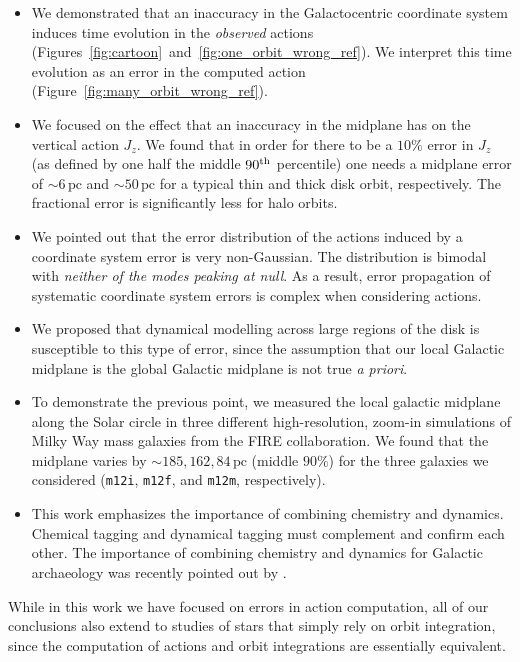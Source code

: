 \documentclass[twocolumn]{aastex62}
\newcommand{\pc}{\text{pc}}
\newcommand{\mi}{\texttt{m12i}}
\newcommand{\mf}{\texttt{m12f}}
\newcommand{\mm}{\texttt{m12m}}
\newcommand{\uth}{\textsuperscript{th}}
\begin{document}
\begin{itemize}
\item We demonstrated that an inaccuracy in the Galactocentric coordinate
system induces time evolution in the {\em observed} actions
(Figures~\ref{fig:cartoon}~and~\ref{fig:one_orbit_wrong_ref}). We interpret
this time evolution as an error in the computed action
(Figure~\ref{fig:many_orbit_wrong_ref}).

\item  We focused on the effect that an
inaccuracy in the midplane has on the vertical action $J_z$. We found that in
order for there to be a $10\%$ error in $J_z$ (as defined by one half the middle
$90\uth$ percentile) one needs a midplane error of $\sim6\,\pc$ and
$\sim50\,\pc$ for a typical thin and thick disk orbit, respectively. The
fractional error is significantly less for halo orbits.

\item We pointed out that the error distribution of the actions induced by a
coordinate system error is very non-Gaussian. The distribution is bimodal with
{\em neither of the modes peaking at 
     null}. 
As a result, error
propagation of systematic coordinate system errors is 
     complex
when considering actions.

\item We proposed that dynamical modelling across large regions of the disk is
susceptible to this type of error, since the assumption that our local
Galactic midplane is the global Galactic midplane is not true {\em a priori}.

\item To demonstrate the previous point, we measured the local galactic
midplane along the Solar circle in three different high-resolution, zoom-in
simulations of Milky Way mass galaxies from the FIRE collaboration. We found
that the midplane varies by $\sim185, 162, 84\,\pc$ (middle $90\%$) for the
three galaxies we considered (\mi{}, \mf{}, and \mm{}, respectively).

\item This work emphasizes the importance of combining chemistry and dynamics.
Chemical tagging \citep{2002ARA&A..40..487F} and dynamical tagging must
complement and confirm each other. The importance of combining chemistry and
dynamics for Galactic archaeology was recently pointed out by
\citet{2019arXiv190210719K}.

\end{itemize}

While in this work we have focused on errors in action computation, all of our
conclusions also extend to studies of stars that simply rely on orbit
integration, since the computation of actions and orbit integrations are
essentially equivalent.
\end{document}

